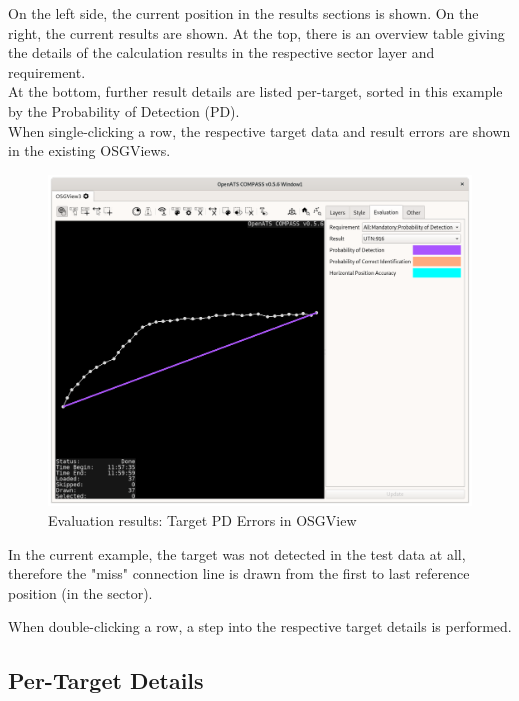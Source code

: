 On the left side, the current position in the results sections is shown. On the right, the current results are shown. At the top, there is an overview table giving the details of the calculation results in the respective sector layer and requirement. \\

At the bottom, further result details are listed per-target, sorted in this example by the Probability of Detection (PD). \\

When single-clicking a row, the respective target data and result errors are shown in the existing OSGViews.

\begin{figure}[H]
  \hspace*{-2.5cm}
    \includegraphics[width=19cm]{../screenshots/eval_results_pd_single_osgview.png}
  \caption{Evaluation results: Target PD Errors in OSGView}
\end{figure}

In the current example, the target was not detected in the test data at all, therefore the "miss" connection line is drawn from the first to last reference position (in the sector).

When double-clicking a row, a step into the respective target details is performed.

\subsection{Per-Target Details}

